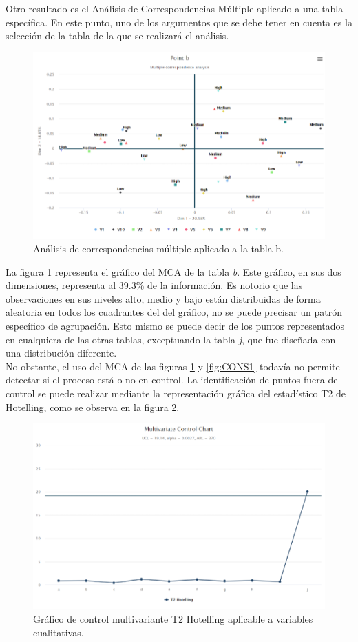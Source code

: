 \documentclass[water,article,submit,moreauthors,pdftex]{mdpi}
\begin{document}
Otro resultado es el Análisis de Correspondencias Múltiple aplicado a
una tabla específica. En este punto, uno de los argumentos que se debe
tener en cuenta es la selección de la tabla de la que se realizará el
análisis.

\begin{figure}[!ht]



\begin{center}\includegraphics[width=0.6\linewidth,]{MCAb} \end{center}

\caption{Análisis de correspondencias múltiple aplicado a la tabla b.}

\label{fig:MCAb}
\end{figure}

La figura \ref{fig:MCAb} representa el gráfico del MCA de la tabla
\emph{b}. Este gráfico, en sus dos dimensiones, representa al 39.3\% de
la información. Es notorio que las observaciones en sus niveles alto,
medio y bajo están distribuidas de forma aleatoria en todos los
cuadrantes del del gráfico, no se puede precisar un patrón específico de
agrupación. Esto mismo se puede decir de los puntos representados en
cualquiera de las otras tablas, exceptuando la tabla \emph{j}, que fue
diseñada con una distribución diferente.\\
No obstante, el uso del MCA de las figuras \ref{fig:MCAb} y
\ref{fig:CONS1} todavía no permite detectar si el proceso está o no en
control. La identificación de puntos fuera de control se puede realizar
mediante la representación gráfica del estadístico T2 de Hotelling, como
se observa en la figura \ref{fig:hot1}.

\begin{figure}[!ht]



\begin{center}\includegraphics[width=0.6\linewidth,]{Hot1} \end{center}

\caption{Gráfico de control multivariante T2 Hotelling aplicable a variables cualitativas.}

\label{fig:hot1}
\end{figure}
\end{document}
